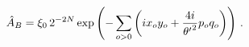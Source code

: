 \begin{equation}
\hat{A}_{B}=\xi _{0}\,2^{-2N}\exp \left( -\sum_{o>0}\left( ix_{o}y_{o}+{%
\frac{4i}{{\theta ^{\prime }}^{2}}}p_{o}q_{o}\right) \right) \,.
\label{butterodd}
\end{equation}

